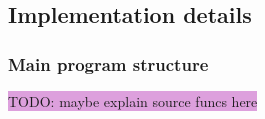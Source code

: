 \documentclass{aa}
\numberwithin{equation}{section}
\numberwithin{table}{section}
\numberwithin{figure}{section}
\begin{document}







\subsection{Implementation details}\label{subsec: IV methods}
\subsubsection{Main program structure}
\colorbox{Plum}{TODO: maybe explain source funcs here}

\end{document}
